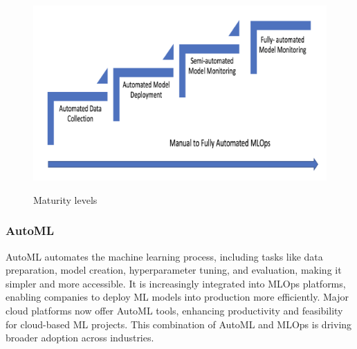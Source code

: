 \begin{figure}[!htbp]
    \caption{Maturity levels \cite{mlops-maturity-model}}
    \centering
    \includegraphics[scale=0.5]{images/maturity-levels}
    \label{fig:maturity}
\end{figure}

\subsubsection{AutoML}

AutoML automates the machine learning process, including tasks like data preparation, model creation, hyperparameter tuning, and evaluation,
making it simpler and more accessible.
It is increasingly integrated into MLOps platforms, enabling companies to deploy ML models into production more efficiently.
Major cloud platforms now offer AutoML tools, enhancing productivity and feasibility for cloud-based ML projects.
This combination of AutoML and MLOps is driving broader adoption across industries.\cite{gift2021practical,mlops-definition-tools-and-challenge}
